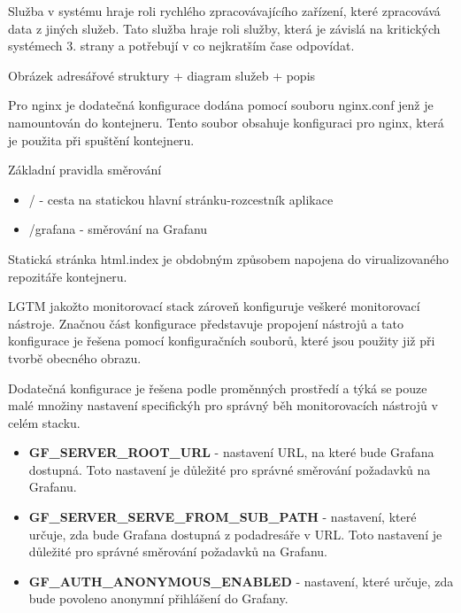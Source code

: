 
Služba v systému hraje roli rychlého zpracovávajícího zařízení, které zpracovává data z jiných služeb. Tato služba hraje roli služby, která je závislá na kritických systémech 3. strany a potřebují v co nejkratším čase odpovídat.


Obrázek adresářové struktury + diagram služeb + popis




Pro nginx je dodatečná konfigurace dodána pomocí souboru nginx.conf jenž je namountován do kontejneru. Tento soubor obsahuje konfiguraci pro nginx, která je použita při spuštění kontejneru.

Základní pravidla směrování

\begin{itemize}
    \item / - cesta na statickou hlavní stránku-rozcestník aplikace
    \item /grafana - směrování na Grafanu
\end{itemize}

Statická stránka html.index je obdobným způsobem napojena do virualizovaného repozitáře kontejneru.


LGTM jakožto monitorovací stack zároveň konfiguruje veškeré monitorovací nástroje. Značnou část konfigurace představuje propojení nástrojů a tato konfigurace je řešena pomocí konfiguračních souborů, které jsou použity již při tvorbě obecného obrazu.

Dodatečná konfigurace je řešena podle proměnných prostředí a týká se pouze malé množiny nastavení specifickýh pro správný běh monitorovacích nástrojů v celém stacku.

\begin{itemize}
    \item \textbf{GF\_SERVER\_ROOT\_URL} - nastavení URL, na které bude Grafana dostupná. Toto nastavení je důležité pro správné směrování požadavků na Grafanu.
    \item \textbf{GF\_SERVER\_SERVE\_FROM\_SUB\_PATH} - nastavení, které určuje, zda bude Grafana dostupná z podadresáře v URL. Toto nastavení je důležité pro správné směrování požadavků na Grafanu.
    \item \textbf{GF\_AUTH\_ANONYMOUS\_ENABLED} - nastavení, které určuje, zda bude povoleno anonymní přihlášení do Grafany.
\end{itemize}


